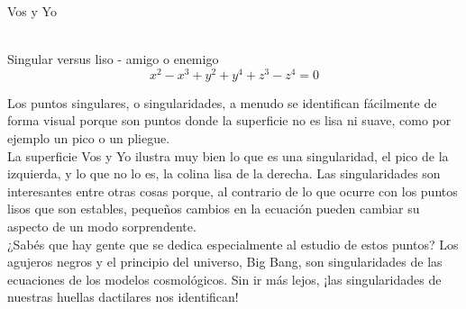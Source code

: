 \documentclass[es]{../../common/SurferDesc}%
\begin{document}
\footnotesize


\begin{surferPage}
  \begin{surferTitle}Vos y Yo\end{surferTitle}  \\
Singular versus liso - amigo o enemigo\\
\smallskip
\[x^2	- x^3+ y^2+ y^4+ z^3- z^4	=  0\]

\vspace{0.3cm}
Los puntos singulares, o singularidades, a menudo se identifican f\'acilmente de forma visual porque son puntos donde la superficie no es lisa ni suave, como por ejemplo un pico o un pliegue.\\
\vspace{0.3cm}
La superficie Vos y Yo ilustra muy bien lo que es una singularidad, el pico de la izquierda, y lo que no lo es, la colina lisa de la derecha. Las singularidades son interesantes entre otras cosas porque, al contrario de lo que ocurre con los puntos lisos que son estables, pequeños cambios en la ecuaci\'on pueden cambiar su aspecto de un modo sorprendente.\\
\vspace{0.3cm}
¿Sab\'es que hay gente que se dedica especialmente al estudio de estos puntos? Los agujeros negros y el principio del universo, Big Bang, son singularidades de las ecuaciones de los modelos cosmol\'ogicos. Sin ir m\'as lejos, ¡las singularidades de nuestras huellas dactilares nos identifican!

  \begin{surferText}
     \end{surferText}
\end{surferPage}
\end{document}
